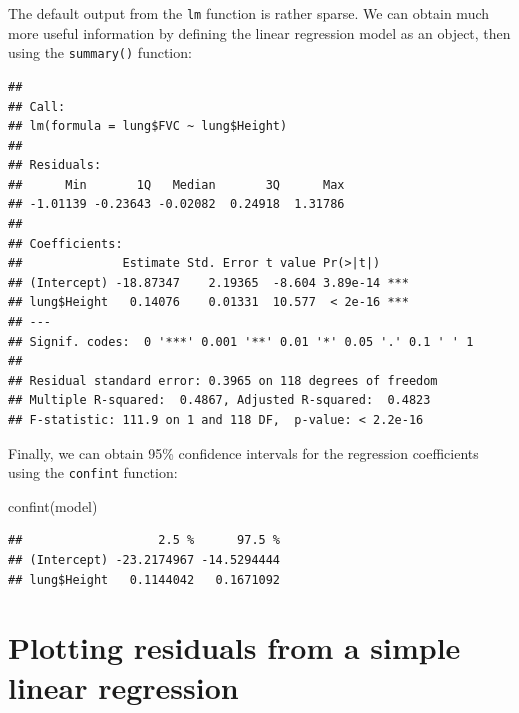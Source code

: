 \documentclass[
]{memoir}
\newenvironment{Shaded}{\begin{snugshade}}{\end{snugshade}}
\newcommand{\FunctionTok}[1]{\textcolor[rgb]{0.00,0.00,0.00}{#1}}
\newcommand{\NormalTok}[1]{#1}
\newcommand{\OtherTok}[1]{\textcolor[rgb]{0.56,0.35,0.01}{#1}}
\newcommand{\SpecialCharTok}[1]{\textcolor[rgb]{0.00,0.00,0.00}{#1}}
\begin{document}
The default output from the \texttt{lm} function is rather sparse. We can obtain much more useful information by defining the linear regression model as an object, then using the \texttt{summary()} function:

\begin{Shaded}
\end{Shaded}

\begin{verbatim}
## 
## Call:
## lm(formula = lung$FVC ~ lung$Height)
## 
## Residuals:
##      Min       1Q   Median       3Q      Max 
## -1.01139 -0.23643 -0.02082  0.24918  1.31786 
## 
## Coefficients:
##              Estimate Std. Error t value Pr(>|t|)    
## (Intercept) -18.87347    2.19365  -8.604 3.89e-14 ***
## lung$Height   0.14076    0.01331  10.577  < 2e-16 ***
## ---
## Signif. codes:  0 '***' 0.001 '**' 0.01 '*' 0.05 '.' 0.1 ' ' 1
## 
## Residual standard error: 0.3965 on 118 degrees of freedom
## Multiple R-squared:  0.4867, Adjusted R-squared:  0.4823 
## F-statistic: 111.9 on 1 and 118 DF,  p-value: < 2.2e-16
\end{verbatim}

Finally, we can obtain 95\% confidence intervals for the regression coefficients using the \texttt{confint} function:

\begin{Shaded}
\begin{Highlighting}[]
\FunctionTok{confint}\NormalTok{(model)}
\end{Highlighting}
\end{Shaded}

\begin{verbatim}
##                   2.5 %      97.5 %
## (Intercept) -23.2174967 -14.5294444
## lung$Height   0.1144042   0.1671092
\end{verbatim}

\hypertarget{plotting-residuals-from-a-simple-linear-regression}{%
\section{Plotting residuals from a simple linear regression}\label{plotting-residuals-from-a-simple-linear-regression}}
\end{document}
